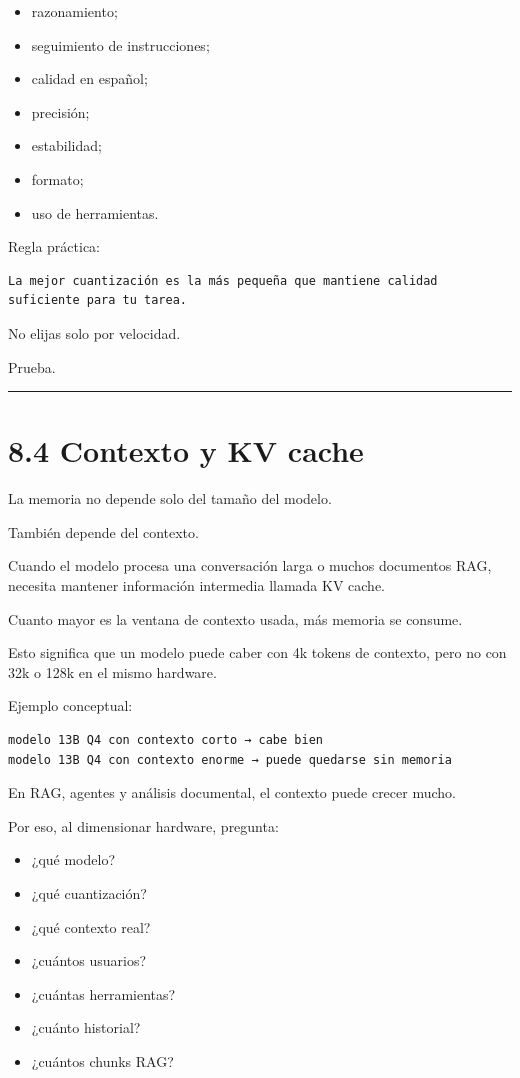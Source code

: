 \begin{itemize}
\tightlist
\item
  razonamiento;
\item
  seguimiento de instrucciones;
\item
  calidad en español;
\item
  precisión;
\item
  estabilidad;
\item
  formato;
\item
  uso de herramientas.
\end{itemize}

Regla práctica:

\begin{lstlisting}
La mejor cuantización es la más pequeña que mantiene calidad suficiente para tu tarea.
\end{lstlisting}

No elijas solo por velocidad.

Prueba.

\begin{center}\rule{0.5\linewidth}{0.5pt}\end{center}

\section{8.4 Contexto y KV cache}\label{contexto-y-kv-cache}

La memoria no depende solo del tamaño del modelo.

También depende del contexto.

Cuando el modelo procesa una conversación larga o muchos documentos RAG,
necesita mantener información intermedia llamada KV cache.

Cuanto mayor es la ventana de contexto usada, más memoria se consume.

Esto significa que un modelo puede caber con 4k tokens de contexto, pero
no con 32k o 128k en el mismo hardware.

Ejemplo conceptual:

\begin{lstlisting}
modelo 13B Q4 con contexto corto → cabe bien
modelo 13B Q4 con contexto enorme → puede quedarse sin memoria
\end{lstlisting}

En RAG, agentes y análisis documental, el contexto puede crecer mucho.

Por eso, al dimensionar hardware, pregunta:

\begin{itemize}
\tightlist
\item
  ¿qué modelo?
\item
  ¿qué cuantización?
\item
  ¿qué contexto real?
\item
  ¿cuántos usuarios?
\item
  ¿cuántas herramientas?
\item
  ¿cuánto historial?
\item
  ¿cuántos chunks RAG?
\end{itemize}

